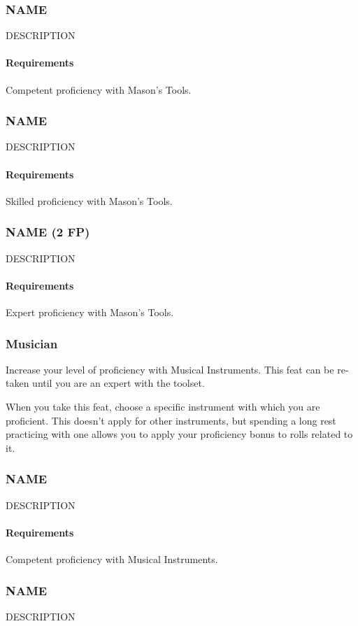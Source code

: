 \subsubsection{NAME} \label{feat::name}
    DESCRIPTION
    \paragraph{Requirements} Competent proficiency with Mason's Tools.
\subsubsection{NAME} \label{feat::name}
    DESCRIPTION
    \paragraph{Requirements} Skilled proficiency with Mason's Tools.
\subsubsection{NAME (2 FP)} \label{feat::name}
    DESCRIPTION
    \paragraph{Requirements} Expert proficiency with Mason's Tools.
\subsubsection{Musician} \label{feat::musician}
    Increase your level of proficiency with Musical Instruments.
    This feat can be re-taken until you are an expert with the toolset.

    When you take this feat, choose a specific instrument with which you are proficient.
    This doesn't apply for other instruments, but spending a long rest practicing with one allows you to apply your proficiency bonus to rolls related to it.
\subsubsection{NAME} \label{feat::name}
    DESCRIPTION
    \paragraph{Requirements} Competent proficiency with Musical Instruments.
\subsubsection{NAME} \label{feat::name}
    DESCRIPTION
